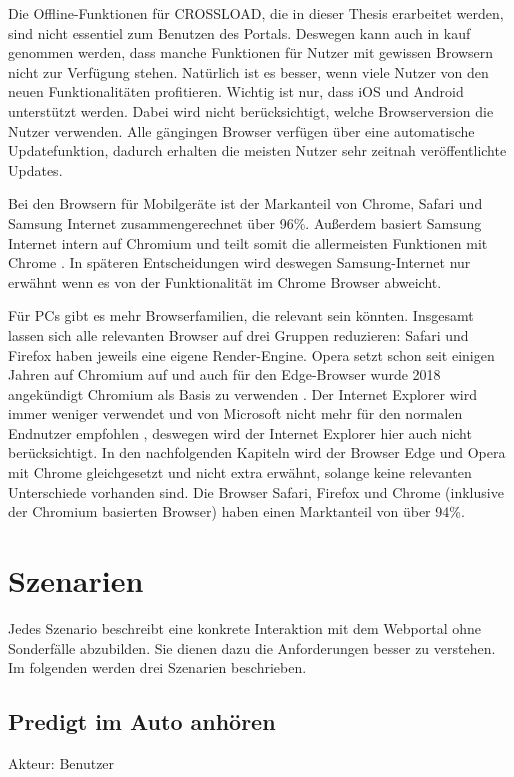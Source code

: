 Die Offline-Funktionen für CROSSLOAD, die in dieser Thesis erarbeitet werden, sind nicht essentiel zum Benutzen des Portals. Deswegen kann auch in kauf genommen werden, dass manche Funktionen für Nutzer mit gewissen Browsern nicht zur Verfügung stehen. Natürlich ist es besser, wenn viele Nutzer von den neuen Funktionalitäten profitieren. Wichtig ist nur, dass iOS und Android unterstützt werden. Dabei wird nicht berücksichtigt, welche Browserversion die Nutzer verwenden. Alle gängingen Browser verfügen über eine automatische Updatefunktion, dadurch erhalten die meisten Nutzer sehr zeitnah veröffentlichte Updates.

Bei den Browsern für Mobilgeräte ist der Markanteil von Chrome, Safari und Samsung Internet zusammengerechnet über 96\%. Außerdem basiert Samsung Internet intern auf Chromium und teilt somit die allermeisten Funktionen mit Chrome \autocite{samsung-webkit}. In späteren Entscheidungen wird deswegen Samsung-Internet nur erwähnt wenn es von der Funktionalität im Chrome Browser abweicht.

Für PCs gibt es mehr Browserfamilien, die relevant sein könnten. Insgesamt lassen sich alle relevanten Browser auf drei Gruppen reduzieren: Safari und Firefox haben jeweils eine eigene Render-Engine. Opera setzt schon seit einigen Jahren auf Chromium auf \autocite{opera-webkit} und auch für den Edge-Browser wurde 2018 angekündigt Chromium als Basis zu verwenden \autocite{edge-faq}. Der Internet Explorer wird immer weniger verwendet und von Microsoft nicht mehr für den normalen Endnutzer empfohlen \autocite{edge-faq}, deswegen wird der Internet Explorer hier auch nicht berücksichtigt. In den nachfolgenden Kapiteln wird der Browser Edge und Opera mit Chrome gleichgesetzt und nicht extra erwähnt, solange keine relevanten Unterschiede vorhanden sind. Die Browser Safari, Firefox und Chrome (inklusive der Chromium basierten Browser) haben einen Marktanteil von über 94\%.

\section{Szenarien}
Jedes Szenario beschreibt eine konkrete Interaktion mit dem Webportal ohne Sonderfälle abzubilden. Sie dienen dazu die Anforderungen besser zu verstehen. Im folgenden werden drei Szenarien beschrieben.

\subsection{Predigt im Auto anhören}
Akteur: Benutzer

